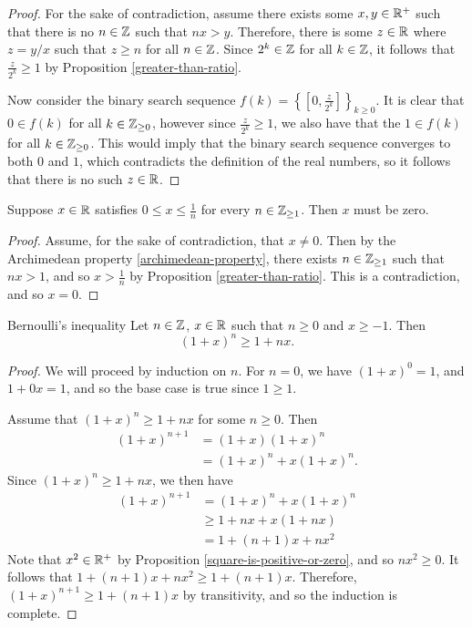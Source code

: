 \begin{proof}
    For the sake of contradiction, assume there exists some $x, y \in \mathbb{R}^{+}$ such that there is no $n \in \mathbb{Z}$ such that $nx > y$. Therefore, there is some $z \in \mathbb{R}$ where $z = y/x$ such that $z \geq n$ for all $n \in \mathbb{Z}$. Since $2^k \in \mathbb{Z}$ for all $k \in \mathbb{Z}$, it follows that $\frac{z}{2^k} \geq 1$ by Proposition \ref{greater-than-ratio}.

    Now consider the binary search sequence $f(k) = \left\{[0, \frac{z}{2^k}]\right\}_{k \geq 0}$. It is clear that $0 \in f(k)$ for all $k \in \mathbb{Z}_{\geq 0}$, however since $\frac{z}{2^k} \geq 1$, we also have that the $1 \in f(k)$ for all $k \in \mathbb{Z}_{\geq 0}$. This would imply that the binary search sequence converges to both $0$ and $1$, which contradicts the definition of the real numbers, so it follows that there is no such $z \in \mathbb{R}$.
\end{proof}

\begin{cor}
    Suppose $x \in \mathbb{R}$ satisfies $0 \leq x \leq \frac{1}{n}$ for every $n \in \mathbb{Z}_{\geq 1}$. Then $x$ must be zero.
\end{cor}

\begin{proof}
    Assume, for the sake of contradiction, that $x \neq 0$. Then by the Archimedean property \ref{archimedean-property}, there exists $n \in \mathbb{Z}_{\geq 1}$ such that $nx > 1$, and so $x > \frac{1}{n}$ by Proposition \ref{greater-than-ratio}. This is a contradiction, and so $x = 0$.
\end{proof}

\begin{thm}\label{bernoullis-inequality}Bernoulli's inequality\proofbreak
    Let $n \in \mathbb{Z}$, $x \in \mathbb{R}$ such that $n \geq 0$ and $x \geq -1$. Then \[(1 + x)^n \geq 1 + nx.\]
\end{thm}

\begin{proof}
    We will proceed by induction on $n$. For $n=0$, we have $(1 + x)^0 = 1$, and $1 + 0x = 1$, and so the base case is true since $1 \geq 1$.

    Assume that $(1 + x)^n \geq 1 + nx$ for some $n \geq 0$. Then
    \begin{align*}
        (1 + x)^{n+1} &= (1 + x)(1 + x)^n \\
        &= (1 + x)^n + x(1 + x)^n.
    \end{align*}
    Since $(1 + x)^n \geq 1 + nx$, we then have
    \begin{align*}
        (1 + x)^{n+1} &= (1 + x)^n + x(1 + x)^n \\
        &\geq 1 + nx + x(1 + nx) \\
        &= 1 + (n+1)x + nx^2
    \end{align*}
    Note that $x^2 \in \mathbb{R}^+$ by Proposition \ref{square-is-positive-or-zero}, and so $nx^2 \geq 0$. It follows that $1 + (n+1)x + nx^2 \geq 1 + (n+1)x$. Therefore, $(1 + x)^{n+1} \geq 1 + (n+1)x$ by transitivity, and so the induction is complete.
\end{proof}

